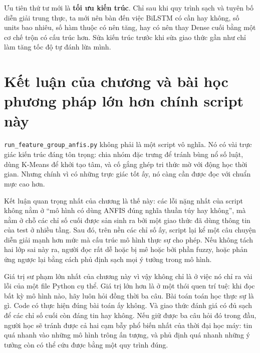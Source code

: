 Ưu tiên thứ tư mới là \textbf{tối ưu kiến trúc}. Chỉ sau khi quy trình sạch và tuyên bố diễn giải trung thực, ta mới nên bàn đến việc BiLSTM có cần hay không, số units bao nhiêu, số hàm thuộc có nên tăng, hay có nên thay Dense cuối bằng một cơ chế trộn có cấu trúc hơn. Sửa kiến trúc trước khi sửa giao thức gần như chỉ làm tăng tốc độ tự đánh lừa mình.

\section{Kết luận của chương và bài học phương pháp lớn hơn chính script này}

\texttt{run\_feature\_group\_anfis.py} không phải là một script vô nghĩa. Nó có vài trực giác kiến trúc đáng tôn trọng: chia nhóm đặc trưng để tránh bùng nổ số luật, dùng K-Means để khởi tạo tâm, và cố gắng ghép tri thức mờ với động học thời gian. Nhưng chính vì có những trực giác tốt ấy, nó càng cần được đọc với chuẩn mực cao hơn.

Kết luận quan trọng nhất của chương là thế này: các lỗi nặng nhất của script không nằm ở ``mô hình có dùng ANFIS đúng nghĩa thuần túy hay không'', mà nằm ở chỗ các chỉ số cuối được sản sinh ra bởi một giao thức đã dùng thông tin của test ở nhiều tầng. Sau đó, trên nền các chỉ số ấy, script lại kể một câu chuyện diễn giải mạnh hơn mức mà cấu trúc mô hình thực sự cho phép. Nếu không tách hai lớp sai này ra, người đọc rất dễ hoặc bị mê hoặc bởi phần fuzzy, hoặc phản ứng ngược lại bằng cách phủ định sạch mọi ý tưởng trong mô hình.

Giá trị sư phạm lớn nhất của chương này vì vậy không chỉ là ở việc nó chỉ ra vài lỗi của một file Python cụ thể. Giá trị lớn hơn là ở một thói quen trí tuệ: khi đọc bất kỳ mô hình nào, hãy luôn hỏi đồng thời ba câu. Bài toán toán học thực sự là gì. Code có thực hiện đúng bài toán ấy không. Và giao thức đánh giá có đủ sạch để các chỉ số cuối còn đáng tin hay không. Nếu giữ được ba câu hỏi đó trong đầu, người học sẽ tránh được cả hai cạm bẫy phổ biến nhất của thời đại học máy: tin quá nhanh vào những mô hình trông ấn tượng, và phủ định quá nhanh những ý tưởng còn có thể cứu được bằng một quy trình đúng.
